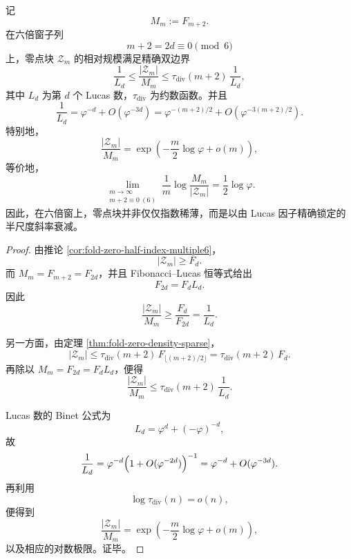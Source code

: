 \begin{theorem}[六倍窗零点块的精确半尺度律]\label{thm:xi-time-part9zk-sixfold-zero-block-exact-halfscale}
记
\[
M_m:=F_{m+2}.
\]
在六倍窗子列
\[
m+2=2d\equiv 0\pmod 6
\]
上，零点块 \(\mathcal Z_m\) 的相对规模满足精确双边界
\[
\frac{1}{L_d}
\le
\frac{|\mathcal Z_m|}{M_m}
\le
\tau_{\mathrm{div}}(m+2)\,\frac{1}{L_d},
\]
其中 \(L_d\) 为第 \(d\) 个 Lucas 数，\(\tau_{\mathrm{div}}\) 为约数函数。并且
\[
\frac{1}{L_d}
=
\varphi^{-d}+O(\varphi^{-3d})
=
\varphi^{-(m+2)/2}
+
O\!\left(\varphi^{-3(m+2)/2}\right).
\]
特别地，
\[
\frac{|\mathcal Z_m|}{M_m}
=
\exp\!\left(
-\frac{m}{2}\log\varphi+o(m)
\right),
\]
等价地，
\[
\lim_{\substack{m\to\infty\\ m+2\equiv 0\ (6)}}
\frac1m\log\frac{M_m}{|\mathcal Z_m|}
=
\frac12\log\varphi.
\]
因此，在六倍窗上，零点块并非仅仅指数稀薄，而是以由 Lucas 因子精确锁定的半尺度斜率衰减。
\end{theorem}
\begin{proof}
由推论 \ref{cor:fold-zero-half-index-multiple6}，
\[
|\mathcal Z_m|\ge F_d.
\]
而 \(M_m=F_{m+2}=F_{2d}\)，并且 Fibonacci--Lucas 恒等式给出
\[
F_{2d}=F_dL_d.
\]
因此
\[
\frac{|\mathcal Z_m|}{M_m}
\ge
\frac{F_d}{F_{2d}}
=
\frac{1}{L_d}.
\]

另一方面，由定理 \ref{thm:fold-zero-density-sparse}，
\[
|\mathcal Z_m|
\le
\tau_{\mathrm{div}}(m+2)\,F_{\lfloor (m+2)/2\rfloor}
=
\tau_{\mathrm{div}}(m+2)\,F_d.
\]
再除以 \(M_m=F_{2d}=F_dL_d\)，便得
\[
\frac{|\mathcal Z_m|}{M_m}
\le
\tau_{\mathrm{div}}(m+2)\,\frac{1}{L_d}.
\]

Lucas 数的 Binet 公式为
\[
L_d=\varphi^d+(-\varphi)^{-d},
\]
故
\[
\frac{1}{L_d}
=
\varphi^{-d}\Bigl(1+O(\varphi^{-2d})\Bigr)^{-1}
=
\varphi^{-d}+O(\varphi^{-3d}).
\]
再利用
\[
\log \tau_{\mathrm{div}}(n)=o(n),
\]
便得到
\[
\frac{|\mathcal Z_m|}{M_m}
=
\exp\!\left(-\frac{m}{2}\log\varphi+o(m)\right),
\]
以及相应的对数极限。证毕。
\end{proof}

